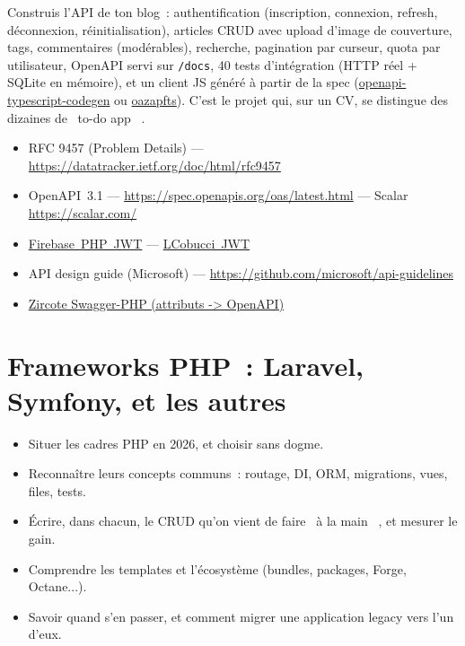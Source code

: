 \documentclass[12pt,a4paper,twoside,openright]{book}
\newcommand{\link}[2]{\href{#2}{#1}}
\begin{document}
\begin{projet}
Construis l'API de ton blog~: authentification (inscription, connexion, refresh, d\'econnexion,
r\'einitialisation), articles CRUD avec upload d'image de couverture, tags, commentaires
(mod\'erables), recherche, pagination par curseur, quota par utilisateur, OpenAPI servi sur
\verb|/docs|, 40 tests d'int\'egration (HTTP r\'eel + SQLite en m\'emoire), et un client JS g\'en\'er\'e
\`a partir de la spec (\link{openapi-typescript-codegen}{https://github.com/feross/openapi-typescript-codegen}
ou \link{oazapfts}{https://github.com/oazapfts/oazapfts}). C'est le projet qui, sur un CV, se
distingue des dizaines de \og ~to-do app~ \fg{}.
\end{projet}

\begin{ressources}
\begin{itemize}
  \item RFC 9457 (Problem Details) --- \url{https://datatracker.ietf.org/doc/html/rfc9457}
  \item OpenAPI~3.1 --- \url{https://spec.openapis.org/oas/latest.html} --- Scalar \url{https://scalar.com/}
  \item \link{Firebase~PHP~JWT}{https://github.com/firebase/php-jwt} --- \link{LCobucci~JWT}{https://github.com/lcobucci/jwt}
  \item API design guide (Microsoft) --- \url{https://github.com/microsoft/api-guidelines}
  \item \link{Zircote Swagger-PHP (attributs -> OpenAPI)}{https://github.com/zircote/swagger-php}
\end{itemize}
\end{ressources}

\chapter{Frameworks PHP~: Laravel, Symfony, et les autres}
\label{ch-php-frameworks}

\begin{objectif}
\begin{itemize}
  \item Situer les cadres PHP en 2026, et choisir sans dogme.
  \item Reconna\^itre leurs concepts communs~: routage, DI, ORM, migrations, vues, files, tests.
  \item \'Ecrire, dans chacun, le CRUD qu'on vient de faire \og ~\`a la main~ \fg{}, et mesurer le gain.
  \item Comprendre les templates et l'\'ecosyst\`eme (bundles, packages, Forge, Octane...).
  \item Savoir quand s'en passer, et comment migrer une application legacy vers l'un d'eux.
\end{itemize}
\end{objectif}
\end{document}
